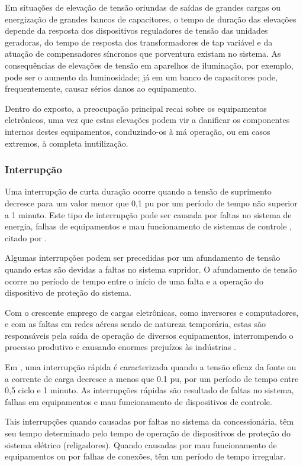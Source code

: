 Em situações de elevação de tensão oriundas de saídas de grandes cargas ou energização de grandes bancos de capacitores, o tempo de duração das elevações depende da resposta dos dispositivos reguladores de tensão das unidades geradoras, do tempo de resposta dos transformadores de tap variável e da atuação de compensadores síncronos que porventura existam no sistema. As consequências de elevações de tensão em aparelhos de iluminação, por exemplo, pode ser o aumento da luminosidade; já em um banco de capacitores pode, frequentemente, causar sérios danos ao equipamento.
\par
Dentro do exposto, a preocupação principal recai sobre os equipamentos eletrônicos, uma vez que estas elevações podem vir a danificar os componentes internos destes equipamentos, conduzindo-os à má operação, ou em casos extremos, à completa inutilização.

\subsubsection{Interrupção}
\par
Uma interrupção de curta duração ocorre quando a tensão de suprimento decresce para um valor menor que 0,1 pu por um período de tempo não superior a 1 minuto. Este tipo de interrupção pode ser causada por faltas no sistema de energia, falhas de equipamentos e mau funcionamento de sistemas de controle \cite{OLIVE}, citado por \cite{DEL03}.
\par
Algumas interrupções podem ser precedidas por um afundamento de tensão quando estas são devidas a faltas no sistema supridor. O afundamento de tensão ocorre no período de tempo entre o início de uma falta e a operação do dispositivo de proteção do sistema.
\par
Com o crescente emprego de cargas eletrônicas, como inversores e computadores, e com as faltas em redes aéreas sendo de natureza temporária, estas são responsáveis pela saída de operação de diversos equipamentos, interrompendo o processo produtivo e causando enormes prejuízos às indústrias \cite{DEL03}.
\par
Em \cite{FER99}, uma interrupção rápida é caracterizada quando a tensão eficaz da fonte ou a corrente de carga decresce a menos que 0.1 pu, por um período de tempo entre 0,5 ciclo e 1 minuto. As interrupções rápidas são resultado de faltas no sistema, falhas em equipamentos e mau funcionamento de dispositivos de controle.
\par
Tais interrupções quando causadas por faltas no sistema da concessionária, têm seu tempo determinado pelo tempo de operação de dispositivos de proteção do sistema elétrico (religadores). Quando causadas por mau funcionamento de equipamentos ou por falhas de conexões, têm um período de tempo irregular.

